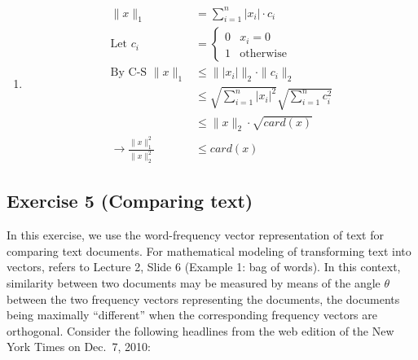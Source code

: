 \documentclass[11pt]{article}
\begin{document}
\begin{solution}
\begin{enumerate}
\item
    \begin{align*}
        \|x\|_1 &= \sum_{i=1}^n |x_i| \cdot c_i \\
        \text{Let } c_i &= \begin{cases}
            0 & x_i = 0 \\
            1 & \text{otherwise}
        \end{cases} \\
        \text{By C-S } \|x\|_1 &\leq \||x_i|\|_2 \cdot \|c_i\|_2 \\
        &\leq \sqrt{\sum_{i=1}^n |x_i|^2} \sqrt{\sum_{i=1}^n c_i^2} \\
        &\leq \|x\|_2 \cdot \sqrt{card(x)} \\
        \rightarrow \frac{\|x\|_1^2}{\|x\|_2^2} &\leq card(x)
    \end{align*}
\end{enumerate}
\end{solution}

\newpage
\subsection*{Exercise 5 (Comparing text)}

In this exercise, we  use the word-fre\-quen\-cy vector representation of text
 for comparing  text documents. For mathematical modeling of transforming text into vectors, refers to Lecture 2, Slide 6 (Example 1: bag of words).
In this context, similarity between two documents may be measured by means of the angle $\theta$ between the two frequency vectors
representing the documents, the documents being maximally ``different'' when the corresponding frequency vectors are orthogonal.
Consider the following
headlines from the web edition of the New York Times on Dec.\ 7, 2010:
\end{document}
